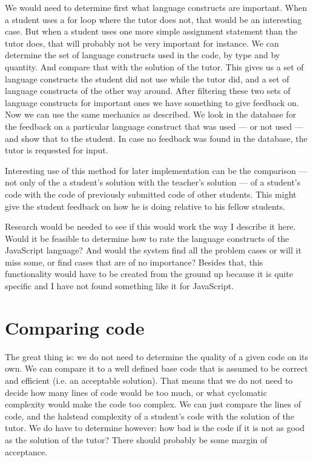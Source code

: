 \documentclass{article}
\begin{document}
We would need to determine first what language constructs are important. When a
student uses a for loop where the tutor does not, that would be an interesting
case. But when a student uses one more simple assignment statement than the
tutor does, that will probably not be very important for instance. We can
determine the set of language constructs used in the code, by type and by
quantity. And compare that with the solution of the tutor. This gives us a set
of language constructs the student did not use while the tutor did, and a set
of language constructs of the other way around. After filtering these two sets
of language constructs for important ones we have something to give feedback
on. Now we can use the same mechanics as \citet{watson2011learning}
described. We look in the database for the feedback on a particular language
construct that was used --- or not used --- and show that to the student. In
case no feedback was found in the database, the tutor is requested for input.

Interesting use of this method for later implementation can be the comparison
--- not only of the a student's solution with the teacher's solution --- of a
student's code with the code of previously submitted code of other
students. This might give the student feedback on how he is doing relative to
his fellow students.

Research would be needed to see if this would work the way I describe it
here. Would it be feasible to determine how to rate the language constructs of
the JavaScript language? And would the system find all the problem cases or
will it miss some, or find cases that are of no importance?  Besides that, this
functionality would have to be created from the ground up because it is quite
specific and I have not found something like it for JavaScript.

\section{Comparing code}

The great thing is: we do not need to determine the quality of a given code
on its own. We can compare it to a well defined base code that is assumed to be
correct and efficient (i.e. an acceptable solution). That means that we do not
need to decide how many lines of code would be too much, or what cyclomatic
complexity would make the code too complex. We can just compare the lines of
code, and the halstead complexity of a student's code with the solution of the
tutor. We do have to determine however: how bad is the code if it is not as
good as the solution of the tutor? There should probably be some margin of
acceptance.
\end{document}

